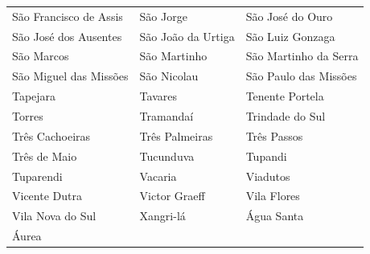\begin{longtable}{lll}
São Francisco de Assis & São Jorge & São José do Ouro \\
São José dos Ausentes & São João da Urtiga & São Luiz Gonzaga \\
São Marcos & São Martinho & São Martinho da Serra \\
São Miguel das Missões & São Nicolau & São Paulo das Missões \\
Tapejara & Tavares & Tenente Portela \\
Torres & Tramandaí & Trindade do Sul \\
Três Cachoeiras & Três Palmeiras & Três Passos \\
Três de Maio & Tucunduva & Tupandi \\
Tuparendi & Vacaria & Viadutos \\
Vicente Dutra & Victor Graeff & Vila Flores \\
Vila Nova do Sul & Xangri-lá & Água Santa \\
Áurea &  &  \\
\end{longtable}
